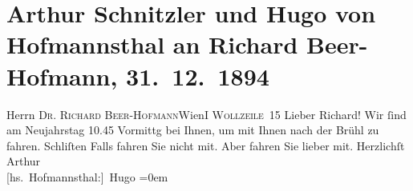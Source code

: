 

         
         \renewcommand{\erwaehntePersonen}{Personen: Richard Beer-Hofmann, Hugo von Hofmannsthal}
         \renewcommand{\erwaehnteOrte}{Orte: Brühl, I., Innere Stadt, Wien, Wollzeile}
         \renewcommand{\erwaehnteWerke}{}
               \section[Arthur Schnitzler und Hugo von Hofmannsthal an Richard Beer-Hofmann, 31. 12. 1894]{ Arthur Schnitzler und Hugo von Hofmannsthal an Richard Beer-Hofmann,
               31. 12. 1894}\nopagebreak{}\rehead{ }\begin{ledgroupsized}[t]{13cm}\normalsize\beginnumbering{} \toendnotes[C]{\smallbreak\pagebreak[2]} 
\pstart{}{\pb}Herrn \textsc{Dr. Richard
                     Beer-Hofmann}\pend{}\pstart{}Wien\pend{}\pstart{}\textsc{I Wollzeile 15}\pend{}{\bigskip}\pstart
           \noindent{}{\pb}Lieber Richard! Wir ſind am Neujahrstag{ }10.45 Vormittg bei Ihnen, um mit Ihnen nach der Brühl zu fahren. Schli{\geminationm}ſten Falls
               fahren Sie nicht mit. Aber fahren Sie lieber mit.\pend
           \pstart
           Herzlichſt \spacefill\mbox{Arthur}{\\[\baselineskip]}\spacefill\mbox{{[}hs. Hofmannsthal:{]} Hugo}\pend
           \leftskip=0em{}
         
         \endnumbering{}\end{ledgroupsized}  \newcommand{\dateiname}{L00413}\newcommand{\titel}{Arthur Schnitzler und Hugo von Hofmannsthal an Richard Beer-Hofmann, 31. 12. 1894}\newcommand{\editorInnen}{ Martin Anton Müller und Gerd-Hermann Susen}
      